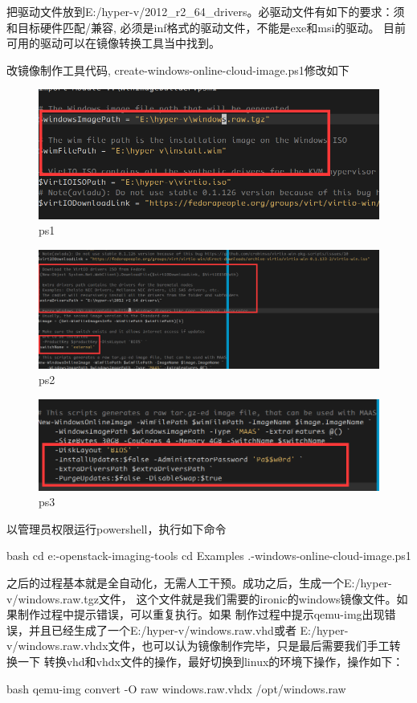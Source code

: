 把驱动文件放到E:/hyper-v/2012\_r2\_64\_drivers。必驱动文件有如下的要求：须和目标硬件匹配/兼容, 必须是inf格式的驱动文件，不能是exe和msi的驱动。
目前可用的驱动可以在镜像转换工具当中找到。

改镜像制作工具代码, create-windows-online-cloud-image.ps1修改如下
\begin{figure}[H]
  \centering
  \includegraphics[scale=0.3]{ps1.png}
  \caption{ps1}
  \label{fig:ps1}
\end{figure}
\begin{figure}[H]
  \centering
  \includegraphics[scale=0.3]{ps2.png}
  \caption{ps2}
  \label{fig:ps2}
\end{figure}
\begin{figure}[H]
  \centering
  \includegraphics[scale=0.3]{ps3.png}
  \caption{ps3}
  \label{fig:ps3}
\end{figure}

以管理员权限运行powershell，执行如下命令
\begin{code-block}{bash}
cd e:\windows-openstack-imaging-tools
cd Examples
.\create-windows-online-cloud-image.ps1
\end{code-block}

之后的过程基本就是全自动化，无需人工干预。成功之后，生成一个E:/hyper-v/windows.raw.tgz文件，
这个文件就是我们需要的ironic的windows镜像文件。如果制作过程中提示错误，可以重复执行。如果
制作过程中提示qemu-img出现错误，并且已经生成了一个E:/hyper-v/windows.raw.vhd或者
E:/hyper-v/windows.raw.vhdx文件，也可以认为镜像制作完毕，只是最后需要我们手工转换一下
转换vhd和vhdx文件的操作，最好切换到linux的环境下操作，操作如下：
\begin{code-block}{bash}
qemu-img convert -O raw windows.raw.vhdx /opt/windows.raw
\end{code-block}

